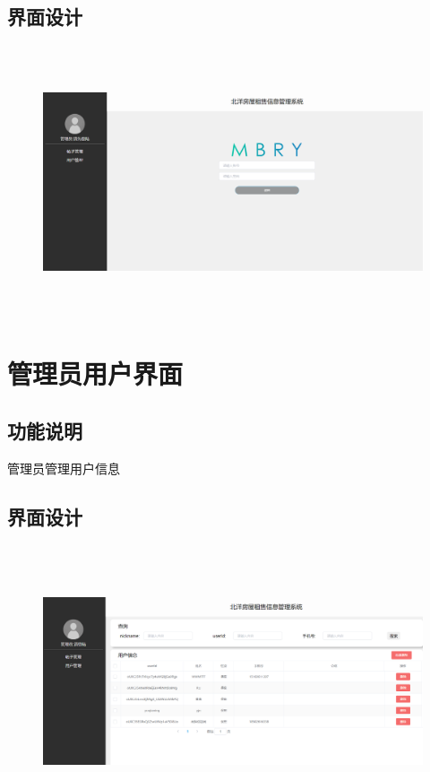 \subsection{界面设计}
\begin{figure}[h]
    \centering 
    \includegraphics[width=14.0cm,height=8.0cm]{design/image/gly.png} 
    \end{figure}
\newpage

\section{管理员用户界面}

\subsection{功能说明}
管理员管理用户信息
\subsection{界面设计}
\begin{figure}[h]
    \centering
    \includegraphics[width=14.0cm,height=8.0cm]{design/image/usergl.png} 
    \end{figure}
\newpage

